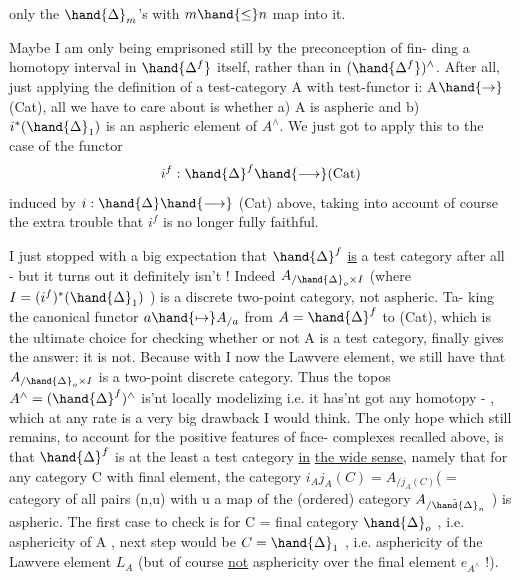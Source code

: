only the $\hand{\Delta}_m$'s with $m\hand{\leq} n$ map into it.

Maybe I am only being emprisoned still by the preconception of fin-%
ding a homotopy interval in $\hand{\Delta^{f}}$ itself, rather than in $(\hand{\Delta^{f}})^{\wedge}$. After all,
just applying the definition of a test-category A with test-functor
i: A$\hand{\rightarrow}$ (Cat), all we have to care about is whether a) A is aspheric and
b) $i^*(\hand{\Delta}_1)$ is an aspheric element of $A^{\wedge}$. We just got to apply this to the
case of the functor
\[ i^{f} : \hand{\Delta}^{f} \hand{\longrightarrow} (\mathrm{Cat}) \]
induced by $i : \hand{\Delta} \hand{\longrightarrow}$ (Cat) above, taking into account of course the
extra trouble that $i^{f}$ is no longer fully faithful.

I just stopped  with a big expectation that $\hand{\Delta}^{f}$ \uline{is} a test category
after all - but it turns out it definitely isn't ! Indeed $A_{/\hand{\Delta}_{o}\times I}$
(where $I =(i^{f})^{*}(\hand{\Delta}_1)$ ) is  a discrete two-point category, not aspheric. Ta-%
king the canonical functor $a \hand{\mapsto} A_{/a}$ from $A= \hand{\Delta}^{f}$ to (Cat), which is the
ultimate choice for checking whether or not A is a test category, finally
gives the answer: it is not. Because with I now the Lawvere element, we
still have that $A_{/\hand{\Delta}_{o}\times I}$ is a two-point discrete category. Thus the topos
$A^{\wedge}= (\hand{\Delta}^{f})^{\wedge}$ is'nt locally modelizing i.e. it has'nt got any homotopy -%
, which at any rate is a very big drawback I would think. The only
hope which still remains, to account for the positive features of face-%
complexes recalled above, is that $\hand{\Delta}^{f}$ is at the least a test category \uline{in}
\uline{the wide sense}, namely that for any category C with final element, the
category $i_A j_A(C) = A_{/j_A(C)}$( = category of all  pairs (n,u)\inserted{,} with
u a map of the (ordered) category $A_{/\tilde{\hand{\Delta}}_n}$ ) is aspheric. The first case to
check is for C = final category $\hand{\Delta}_o$ , i.e.  asphericity of A ,
next step would be $C =\hand{\Delta}_1$ , i.e. asphericity of the Lawvere element $L_A$
(but of course \uline{not} asphericity over the final element $e_{A^{\wedge}}$ !).

